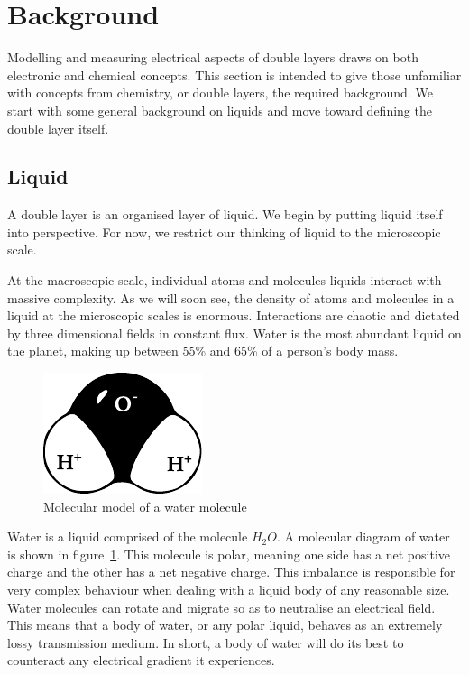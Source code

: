 
\section{Background}
  Modelling and measuring electrical aspects of double layers draws on both electronic and chemical concepts.
  This section is intended to give those unfamiliar with concepts from chemistry, or double layers, the required background.
  We start with some general background on liquids and move toward defining the double layer itself.

  \subsection{Liquid}
    A double layer is an organised layer of liquid.
    We begin by putting liquid itself into perspective.
    For now, we restrict our thinking of liquid to the microscopic scale.
    
    At the macroscopic scale, individual atoms and molecules liquids interact with massive complexity.
    As we will soon see, the density of atoms and molecules in a liquid at the microscopic scales is enormous.
    Interactions are chaotic and dictated by three dimensional fields in constant flux.
    Water is the most abundant liquid on the planet, making up between 55\% and 65\% of a person's body mass.

    \begin{figure}
        \begin{center}
            \includegraphics{content/introduction/graphics/polarWater}
        \end{center}
        \caption{Molecular model of a water molecule}
        \label{fig:waterMolecule}
    \end{figure}

    Water is a liquid comprised of the molecule $H_{2}O$.
    A molecular diagram of water is shown in figure~\ref{fig:waterMolecule}.
    This molecule is polar, meaning one side has a net positive charge and the other has a net negative charge.
    This imbalance is responsible for very complex behaviour when dealing with a liquid body of any reasonable size.
    Water molecules can rotate and migrate so as to neutralise an electrical field.
    This means that a body of water, or any polar liquid, behaves as an extremely lossy transmission medium.
    In short, a body of water will do its best to counteract any electrical gradient it experiences.

